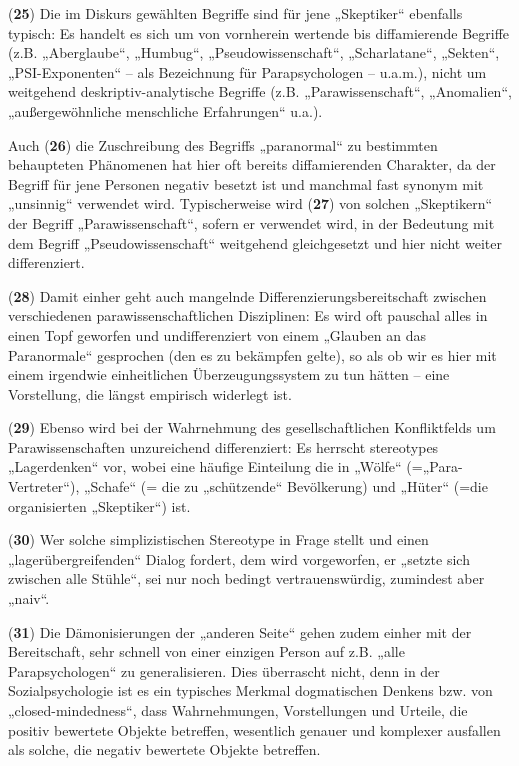 (\textbf{25}) Die im Diskurs gewählten Begriffe sind für jene
„Skeptiker`` ebenfalls typisch: Es handelt es sich um von vornherein
wertende bis diffamierende Begriffe (z.B. „Aberglaube``, „Humbug``,
„Pseudowissenschaft``, „Scharlatane``, „Sekten``, „PSI-Exponenten`` --
als Bezeichnung für Parapsychologen -- u.a.m.), nicht um weitgehend
deskriptiv-analytische Begriffe (z.B. „Parawissenschaft``, „Anomalien``,
„außergewöhnliche menschliche Erfahrungen`` u.a.).

Auch (\textbf{26}) die Zuschreibung des Begriffs „paranormal`` zu
bestimmten behaupteten Phänomenen hat hier oft bereits diffamierenden
Charakter, da der Begriff für jene Personen negativ besetzt ist und
manchmal fast synonym mit „unsinnig`` verwendet wird. Typischerweise
wird (\textbf{27}) von solchen „Skeptikern`` der Begriff
„Parawissenschaft``, sofern er verwendet wird, in der Bedeutung mit dem
Begriff „Pseudowissenschaft`` weitgehend gleichgesetzt und hier nicht
weiter differenziert.

(\textbf{28}) Damit einher geht auch mangelnde
Differenzierungsbereitschaft zwischen verschiedenen
parawissenschaftlichen Disziplinen: Es wird oft pauschal alles in einen
Topf geworfen und undifferenziert von einem „Glauben an das
Paranormale`` gesprochen (den es zu bekämpfen gelte), so als ob wir es
hier mit einem irgendwie einheitlichen Überzeugungssystem zu tun hätten
-- eine Vorstellung, die längst empirisch widerlegt ist.

(\textbf{29}) Ebenso wird bei der Wahrnehmung des gesellschaftlichen
Konfliktfelds um Parawissenschaften unzureichend differenziert: Es
herrscht stereotypes „Lagerdenken`` vor, wobei eine häufige Einteilung
die in „Wölfe`` (=„Para-Vertreter``), „Schafe`` (= die zu „schützende``
Bevölkerung) und „Hüter`` (=die organisierten „Skeptiker``) ist.

(\textbf{30}) Wer solche simplizistischen Stereotype in Frage stellt und
einen „lagerübergreifenden`` Dialog fordert, dem wird vorgeworfen, er
„setzte sich zwischen alle Stühle``, sei nur noch bedingt
vertrauenswürdig, zumindest aber „naiv``.

(\textbf{31}) Die Dämonisierungen der „anderen Seite`` gehen zudem
einher mit der Bereitschaft, sehr schnell von einer einzigen Person auf
z.B. „alle Parapsychologen`` zu generalisieren. Dies überrascht nicht,
denn in der Sozialpsychologie ist es ein typisches Merkmal dogmatischen
Denkens bzw. von „closed-mindedness``, dass Wahrnehmungen, Vorstellungen
und Urteile, die positiv bewertete Objekte betreffen, wesentlich genauer
und komplexer ausfallen als solche, die negativ bewertete Objekte
betreffen.

